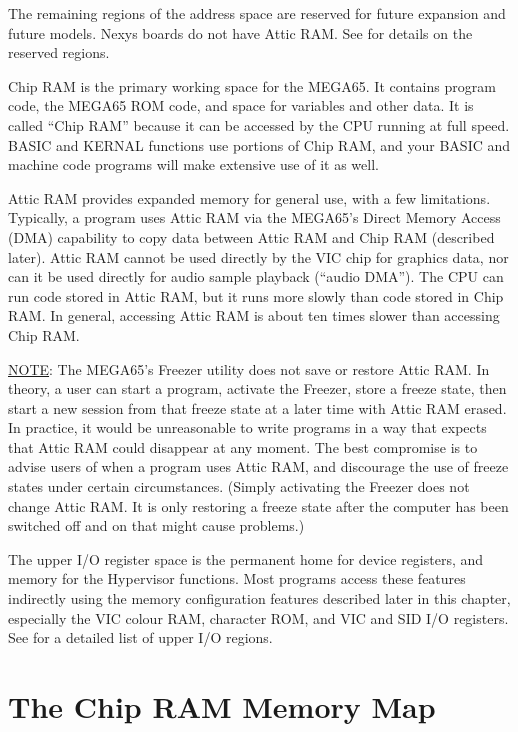 The remaining regions of the address space are reserved for future expansion and future models. Nexys boards do not have Attic RAM. See  for details on the reserved regions.

Chip RAM is the primary working space for the MEGA65. It contains program code, the MEGA65 ROM code, and space for variables and other data. It is called ``Chip RAM'' because it can be accessed by the CPU running at full speed. BASIC and KERNAL functions use portions of Chip RAM, and your BASIC and machine code programs will make extensive use of it as well.

Attic RAM provides expanded memory for general use, with a few limitations. Typically, a program uses Attic RAM via the MEGA65's Direct Memory Access (DMA) capability to copy data between Attic RAM and Chip RAM (described later). Attic RAM cannot be used directly by the VIC chip for graphics data, nor can it be used directly for audio sample playback (``audio DMA''). The CPU can run code stored in Attic RAM, but it runs more slowly than code stored in Chip RAM. In general, accessing Attic RAM is about ten times slower than accessing Chip RAM.

\underline{NOTE}: The MEGA65's Freezer utility does not save or restore Attic RAM. In theory, a user can start a program, activate the Freezer, store a freeze state, then start a new session from that freeze state at a later time with Attic RAM erased. In practice, it would be unreasonable to write programs in a way that expects that Attic RAM could disappear at any moment. The best compromise is to advise users of when a program uses Attic RAM, and discourage the use of freeze states under certain circumstances. (Simply activating the Freezer does not change Attic RAM. It is only restoring a freeze state after the computer has been switched off and on that might cause problems.)

The upper I/O register space is the permanent home for device registers, and memory for the Hypervisor functions. Most programs access these features indirectly using the memory configuration features described later in this chapter, especially the VIC colour RAM, character ROM, and VIC and SID I/O registers. See  for a detailed list of upper I/O regions.


\newpage
\section{The Chip RAM Memory Map}

